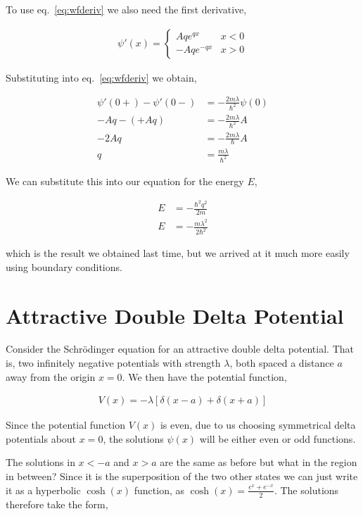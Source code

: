 \documentclass[11pt]{amsart}
\begin{document}
To use eq.~\ref{eq:wfderiv} we also need the first derivative,

\begin{align*}
  \psi'(x) =
  \begin{cases}
    Aqe^{qx} & x < 0 \\
    -Aqe^{-qx} & x > 0
  \end{cases}
\end{align*}

Substituting into eq.~\ref{eq:wfderiv} we obtain,

\begin{align*}
  \psi'(0+)-\psi'(0-) &= -\frac{2m\lambda}{\hbar^2}\psi(0) \\
  -Aq - (+Aq) &= -\frac{2m\lambda}{\hbar^2}A \\
  -2Aq &= -\frac{2m\lambda}{\hbar} A \\
  q &= \frac{m\lambda}{\hbar^2}
\end{align*}

We can substitute this into our equation for the energy $E$,

\begin{align*}
  E &= -\frac{\hbar^2q^2}{2m} \\
  E &= -\frac{m\lambda^2}{2\hbar^2}
\end{align*}

which is the result we obtained last time, but we arrived at it much more easily using boundary conditions.

\section{Attractive Double Delta Potential}

Consider the Schr\"{o}dinger equation for an attractive double delta potential. That is, two infinitely negative potentials with strength $\lambda$, both spaced a distance $a$ away from the origin $x = 0$. We then have the potential function,

\begin{align*}
  V(x) = -\lambda\left[\delta(x - a) + \delta(x + a)\right]
\end{align*}

Since the potential function $V(x)$ is even, due to us choosing symmetrical delta potentials about $x = 0$, the solutions $\psi(x)$ will be either even or odd functions.

The solutions in $x < -a$ and $x > a$ are the same as before but what in the region in between? Since it is the superposition of the two other states we can just write it as a hyperbolic $\cosh(x)$ function, as $\cosh(x) = \frac{e^x + e^{-x}}{2}$. The solutions therefore take the form,
\end{document}
